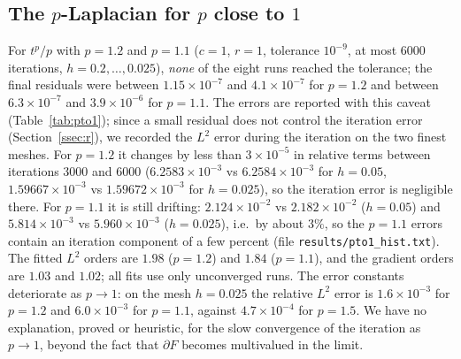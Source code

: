 \documentclass[11pt]{amsart}
\theoremstyle{definition}
\theoremstyle{remark}
\numberwithin{equation}{section}
\begin{document}
\subsection{\texorpdfstring{The $p$-Laplacian for $p$ close to $1$}{The p-Laplacian for p close to 1}}\label{ssec:pto1}
For $t^p/p$ with $p=1.2$ and $p=1.1$ ($c=1$, $r=1$, tolerance $10^{-9}$, at most $6000$ iterations, $h=0.2,\dots,0.025$), \emph{none} of the eight runs reached the tolerance; the final residuals were between $1.15\times10^{-7}$ and $4.1\times10^{-7}$ for $p=1.2$ and between $6.3\times10^{-7}$ and $3.9\times10^{-6}$ for $p=1.1$. The errors are reported with this caveat (Table~\ref{tab:pto1}); since a small residual does not control the iteration error (Section~\ref{ssec:r}), we recorded the $L^2$ error during the iteration on the two finest meshes. For $p=1.2$ it changes by less than $3\times10^{-5}$ in relative terms between iterations $3000$ and $6000$ ($6.2583\times10^{-3}$ vs $6.2584\times10^{-3}$ for $h=0.05$, $1.59667\times10^{-3}$ vs $1.59672\times10^{-3}$ for $h=0.025$), so the iteration error is negligible there. For $p=1.1$ it is still drifting: $2.124\times10^{-2}$ vs $2.182\times10^{-2}$ ($h=0.05$) and $5.814\times10^{-3}$ vs $5.960\times10^{-3}$ ($h=0.025$), i.e.\ by about $3\%$, so the $p=1.1$ errors contain an iteration component of a few percent (file \texttt{results/pto1\_hist.txt}). The fitted $L^2$ orders are $1.98$ ($p=1.2$) and $1.84$ ($p=1.1$), and the gradient orders are $1.03$ and $1.02$; all fits use only unconverged runs. The error constants deteriorate as $p\to1$: on the mesh $h=0.025$ the relative $L^2$ error is $1.6\times10^{-3}$ for $p=1.2$ and $6.0\times10^{-3}$ for $p=1.1$, against $4.7\times10^{-4}$ for $p=1.5$. We have no explanation, proved or heuristic, for the slow convergence of the iteration as $p\to1$, beyond the fact that $\partial F$ becomes multivalued in the limit.
\end{document}
